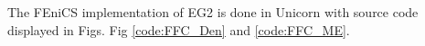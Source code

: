 The FEniCS implementation of EG2 is done in Unicorn
\cite{chapter:implementation:unicorn} with source code displayed in Figs. 
Fig \ref{code:FFC_Den} and \ref{code:FFC_ME}.

% 


